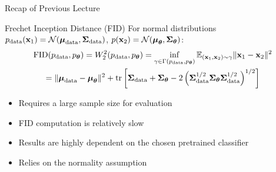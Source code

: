 \documentclass{beamer}
\begin{document}
\begin{frame}{Recap of Previous Lecture}
	\vspace{-0.3cm}
	\begin{block}{Frechet Inception Distance (FID)}
		For normal distributions $p_{\text{data}}(\mathbf{x}_1) = \mathcal{N}(\boldsymbol{\mu}_{\text{data}}, \boldsymbol{\Sigma}_{\text{data}})$, $p(\mathbf{x}_2) = \mathcal{N}(\boldsymbol{\mu}_{\boldsymbol{\theta}}, \boldsymbol{\Sigma}_{\boldsymbol{\theta}})$:
		\vspace{-0.3cm}
		\begin{multline*}
			\mathrm{FID} (p_{\text{data}}, p_{\boldsymbol{\theta}}) =  W_2^2(p_{\text{data}}, p_{\boldsymbol{\theta}}) = \inf_{\gamma \in \Gamma(p_{\text{data}}, p_{\boldsymbol{\theta}})} \mathbb{E}_{(\mathbf{x}_1, \mathbf{x}_2) \sim \gamma} \| \mathbf{x}_1 - \mathbf{x}_2 \|^2 \\
			= \| \boldsymbol{\mu}_{\text{data}} - \boldsymbol{\mu}_{\boldsymbol{\theta}}\|^2 + \operatorname{tr} \left[ \boldsymbol{\Sigma}_{\text{data}} + \boldsymbol{\Sigma}_{\boldsymbol{\theta}} - 2 \left(\boldsymbol{\Sigma}_{\text{data}}^{1/2} \boldsymbol{\Sigma}_{\boldsymbol{\theta}} \boldsymbol{\Sigma}_{\text{data}}^{1/2} \right)^{1/2} \right]
		\end{multline*}
		\vspace{-0.4cm}
	\end{block}
	\begin{itemize}
		\item Requires a large sample size for evaluation
		\item FID computation is relatively slow
		\item Results are highly dependent on the chosen pretrained classifier
		\item Relies on the normality assumption
	\end{itemize}
\end{frame}
\end{document}
